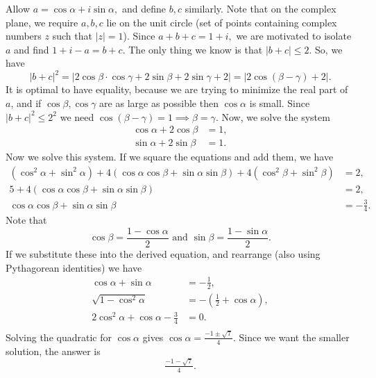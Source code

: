 \begin{solution}[name={Solution by HrishiP}]
	Allow $a=\cos \alpha + i \sin \alpha,$ and define $b,c$ similarly. Note that on the complex plane, we require $a,b,c$ lie on the unit circle (set of points containing complex numbers $z$ such that $|z|=1$). Since $a+b+c = 1+i,$ we are motivated to isolate $a$ and find $1+i-a = b+c.$ The only thing we know is that $|b+c| \le 2.$ So, we have
	$$|b+c|^2 = |2\cos \beta \cdot \cos \gamma + 2 \sin \beta+ 2 \sin \gamma + 2| = |2\cos(\beta-\gamma)+2|.$$It is optimal to have equality, because we are trying to minimize the real part of $a$, and if $\cos \beta, \cos \gamma$ are as large as possible then $\cos \alpha$ is small. Since $|b+c|^2 \le 2^2$ we need $\cos(\beta-\gamma) = 1 \implies \beta = \gamma.$ Now, we solve the system
	\begin{align*}
		\cos \alpha + 2\cos \beta &= 1,\\ 
		\sin \alpha + 2\sin \beta &=1.
	\end{align*}
	Now we solve this system. If we square the equations and add them, we have
	\begin{align*}
		(\cos^2 \alpha + \sin^2 \alpha) + 4(\cos \alpha \cos \beta + \sin \alpha \sin \beta) + 4(\cos^2 \beta + \sin^2 \beta) &= 2,\\
		5+4(\cos \alpha \cos \beta + \sin \alpha \sin \beta)&= 2,\\
		\cos \alpha \cos \beta + \sin \alpha \sin \beta &= -\tfrac 34.
	\end{align*}Note that
	$$\cos \beta = \frac{1-\cos \alpha}{2} \text{  and  } \sin \beta = \frac{1-\sin \alpha}{2}.$$
	If we substitute these into the derived equation, and rearrange (also using Pythagorean identities) we have
	\begin{align*}
		\cos \alpha + \sin \alpha &= -\tfrac 12,\\
		\sqrt{1-\cos^2 \alpha} &= -\left(\tfrac 12 + \cos \alpha\right),\\
		2\cos^2 \alpha + \cos \alpha - \tfrac 34 &= 0.\\
	\end{align*}Solving the quadratic for $\cos \alpha$ gives $\cos \alpha = \tfrac{-1\pm \sqrt{7}}{4}.$ Since we want the smaller solution, the answer is $$\boxed{\tfrac{-1 -\sqrt{7}}{4}}.$$
\end{solution}













